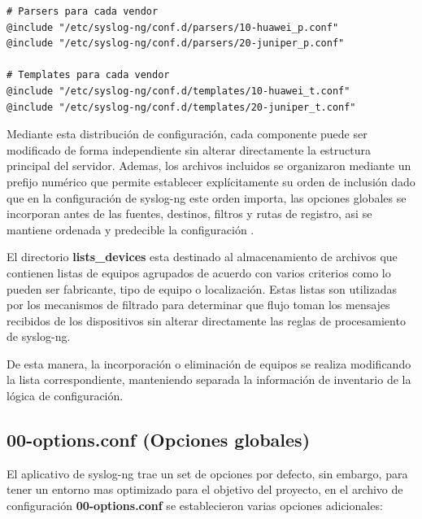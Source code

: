\begin{lstlisting}[style=logstyle]
# Parsers para cada vendor
@include "/etc/syslog-ng/conf.d/parsers/10-huawei_p.conf"
@include "/etc/syslog-ng/conf.d/parsers/20-juniper_p.conf"

# Templates para cada vendor
@include "/etc/syslog-ng/conf.d/templates/10-huawei_t.conf"
@include "/etc/syslog-ng/conf.d/templates/20-juniper_t.conf"
\end{lstlisting}

Mediante esta distribución de configuración, cada componente puede ser modificado de forma independiente sin alterar directamente la estructura principal del servidor. Ademas, los archivos incluidos se organizaron mediante un prefijo numérico que permite establecer explícitamente su orden de inclusión dado que en la configuración de syslog-ng este orden importa, las opciones globales se incorporan antes de las fuentes, destinos, filtros y rutas de registro, asi se mantiene ordenada y predecible la configuración \cite{syslogng_include}.

El directorio \textbf{lists\_devices} esta destinado al almacenamiento de archivos que contienen listas de equipos agrupados de acuerdo con varios criterios como lo pueden ser fabricante, tipo de equipo o localización. Estas listas son utilizadas por los mecanismos de filtrado para determinar que flujo toman los mensajes recibidos de los dispositivos sin alterar directamente las reglas de procesamiento de syslog-ng.

De esta manera, la incorporación o eliminación de equipos se realiza modificando la lista correspondiente, manteniendo separada la información de inventario de la lógica de configuración.

\subsection{00-options.conf (Opciones globales)}
El aplicativo de syslog-ng trae un set de opciones por defecto, sin embargo, para tener un entorno mas optimizado para el objetivo del proyecto, en el archivo de configuración \textbf{00-options.conf} se establecieron varias opciones adicionales:

